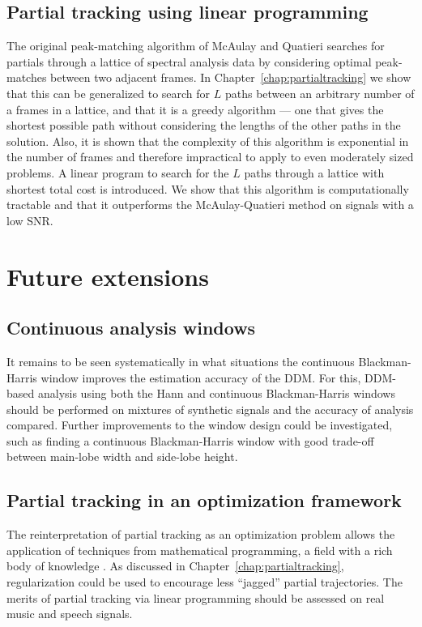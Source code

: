 \subsection{Partial tracking using linear programming}

The original peak-matching algorithm of McAulay and Quatieri
\cite{mcaulay1986speech} searches for partials through a lattice of spectral
analysis data by considering optimal peak-matches between two adjacent frames.
In Chapter~\ref{chap:partialtracking} we show that this can be generalized to
search for $L$ paths between an arbitrary number of a frames in a lattice, and
that it is a greedy algorithm --- one that gives the shortest possible path
without considering the lengths of the other paths in the solution. Also, it is
shown that the complexity of this algorithm is exponential in the number of
frames and therefore impractical to apply to even moderately sized problems. A
linear program to search for the $L$ paths through a lattice with shortest total
cost is introduced. We show that this algorithm is computationally tractable and
that it outperforms the McAulay-Quatieri method on signals with a low SNR.

\section{Future extensions}

\subsection{Continuous analysis windows}

It remains to be seen systematically in what situations the continuous
Blackman-Harris window improves the estimation accuracy of the DDM. For this,
DDM-based analysis using both the Hann and continuous Blackman-Harris windows
should be performed on mixtures of synthetic signals and the accuracy of
analysis compared. Further improvements to the window design could be
investigated, such as finding a continuous Blackman-Harris window with good
trade-off between main-lobe width and side-lobe height.

\subsection{Partial tracking in an optimization framework}

The reinterpretation of partial tracking as an optimization problem allows the
application of techniques from mathematical programming, a field with
a rich body of knowledge \cite{boyd2004convex}. As discussed in
Chapter~\ref{chap:partialtracking}, regularization could be used to encourage
less ``jagged'' partial trajectories. The merits of partial tracking via
linear programming should be assessed on real music and speech signals.

